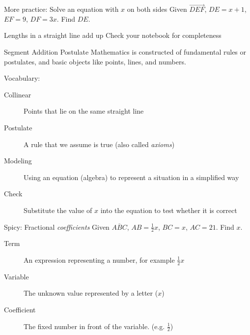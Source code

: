 \begin{frame}{More practice: Solve an equation with $x$ on both sides}
  Given $\overrightarrow{DEF}$, $DE=x+1$, $EF=9$, $DF=3x$. Find ${DE}$.\vspace{1cm}
  \begin{center}   
  \end{center} \vspace{3cm}
\end{frame}

\begin{frame}{Lengths in a straight line add up}
  {Check your notebook for completeness}
\begin{block}{Segment Addition Postulate}
  Mathematics is constructed of fundamental rules or postulates, and basic objects like points, lines, and numbers.
\end{block} \vspace{1cm}
  Vocabulary:
    \begin{description}
      \item[Collinear] Points that lie on the same straight line
      \item[Postulate] A rule that we assume is true (also called \emph{axioms})
      \item[Modeling] Using an equation (algebra) to represent a situation in a simplified way
      \item[Check] Substitute the value of $x$ into the equation to test whether it is correct
    \end{description}
\end{frame}

\begin{frame}{Spicy: Fractional \emph{coefficients}}
  Given $\overline{ABC}$, $AB=\frac{1}{2}x$, $BC=x$, $AC=21$. Find ${x}$.\vspace{1cm}
  \begin{center}   
  \end{center} \vspace{3cm}
  \begin{description}
    \item[Term] An expression representing a number, for example $\frac{1}{2}x$
    \item[Variable] The unknown value represented by a letter ($x$)
    \item[Coefficient] The fixed number in front of the variable. (e.g. $\frac{1}{2}$) 
    \end{description}
\end{frame}

